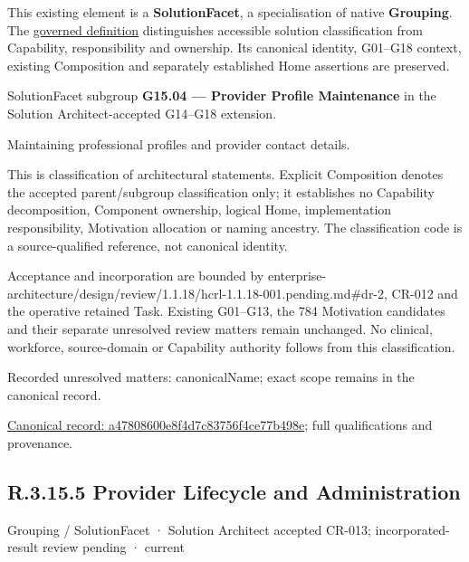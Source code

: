 This existing element is a \textbf{SolutionFacet}, a specialisation of native
\textbf{Grouping}. The \href{\detokenize{../../../../../../../governance/continuum-representation.md#solutionfacet-classification--1119-candidate}}{governed definition}
distinguishes accessible solution classification from Capability, responsibility
and ownership. Its canonical identity, G01–G18 context, existing Composition
and separately established Home assertions are preserved.



SolutionFacet subgroup \textbf{G15.04 — Provider Profile Maintenance} in the Solution Architect-accepted G14–G18 extension.



Maintaining professional profiles and provider contact details.



This is classification of architectural statements. Explicit Composition denotes the accepted parent/subgroup classification only; it establishes no Capability decomposition, Component ownership, logical Home, implementation responsibility, Motivation allocation or naming ancestry. The classification code is a source-qualified reference, not canonical identity.



Acceptance and incorporation are bounded by enterprise-architecture/design/review/1.1.18/hcrl-1.1.18-001.pending.md\#dr-2, CR-012 and the operative retained Task. Existing G01–G13, the 784 Motivation candidates and their separate unresolved review matters remain unchanged. No clinical, workforce, source-domain or Capability authority follows from this classification.


{\small Recorded unresolved matters: canonicalName; exact scope remains in the canonical record.}\par
{\footnotesize \href{../../../../../../../continuum/grouping/a47808600e8f4d7c83756f4ce77b498e.md}{Canonical record: a47808600e8f4d7c83756f4ce77b498e}; full qualifications and provenance.}\par
\subsection*{R.3.15.5 Provider Lifecycle and Administration}
\label{navigation:R.3.15.5}

\label{element:ad16265c76114f4eaddf75b0be2d4755}
{\small Grouping / SolutionFacet · Solution Architect accepted CR-013; incorporated-result review pending · current}\par

